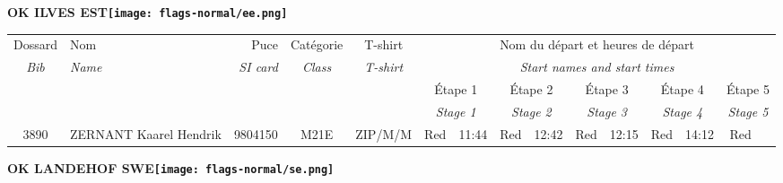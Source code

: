 \documentclass{report}
\begin{document}
\newpage
  \Huge \centering \bfseries OK ILVES  EST\normalfont \footnotesize \sffamily \hfill \texttt{[image: flags-normal/ee.png]} \newline 
  \begin{longtable}{|c|l|r|c|c|*{5}{cc|}}
    Dossard & Nom  & Puce    & Catégorie & T-shirt & \multicolumn{10}{c|}{Nom du départ et heures de départ} \\
    \itshape Bib     & \itshape Name & \itshape SI card & \itshape Class  & \itshape  T-shirt  & \multicolumn{10}{c|}{\itshape Start names and start times} \\
    \hline
    & & & & & \multicolumn{2}{c|}{Étape 1} & \multicolumn{2}{c|}{Étape 2} & \multicolumn{2}{c|}{Étape 3} & \multicolumn{2}{c|}{Étape 4} & \multicolumn{2}{c|}{Étape 5} \\
    & & & & & \multicolumn{2}{c|}{\itshape Stage 1} & \multicolumn{2}{c|}{\itshape Stage 2} & \multicolumn{2}{c|}{\itshape Stage 3} & \multicolumn{2}{c|}{\itshape Stage 4} & \multicolumn{2}{c|}{\itshape Stage 5} \\
    \hline
    3890 & ZERNANT Kaarel Hendrik & 9804150 & M21E & ZIP/M/M & Red & 11:44 & Red & 12:42 & Red & 12:15 & Red & 14:12 & Red &  \\
  \end{longtable}
\newpage
  \Huge \centering \bfseries OK LANDEHOF  SWE\normalfont \footnotesize \sffamily \hfill \texttt{[image: flags-normal/se.png]} \newline 
\end{document}
